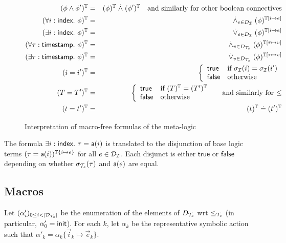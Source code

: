 \begin{figure}
  \begin{eqnarray*}
    (\phi\wedge\phi')^{\mathbb{T}} &=& (\phi)^{\mathbb{T}} \stackrel{.}{\wedge} (\phi')^{\mathbb{T}}
    \quad \text{and similarly for other boolean connectives} \\
    (\forall i:\textsf{index}.~ \phi)^{\mathbb{T}} &=&
    \stackrel{.}{\wedge}_{e\in D_{\mathcal{I}}} (\phi)^{\mathbb{T}[i\mapsto e]} \\
    (\exists i:\textsf{index}.~ \phi)^{\mathbb{T}} &=&
    \stackrel{.}{\vee}_{e\in D_{\mathcal{I}}} (\phi)^{\mathbb{T}[i\mapsto e]} \\
    (\forall \tau:\textsf{timestamp}.~ \phi)^{\mathbb{T}} &=&
    \stackrel{.}{\wedge}_{v\in D_{\mathcal{T}_s}} (\phi)^{\mathbb{T}[\tau\mapsto v]} \\
    (\exists \tau:\textsf{timestamp}.~ \phi)^{\mathbb{T}} &=&
    \stackrel{.}{\vee}_{v\in D_{\mathcal{T}_s}} (\phi)^{\mathbb{T}[\tau\mapsto v]} \\
    (i=i')^{\mathbb{T}} &=&
    \left\{\begin{array}{ll}
      \mathsf{true} & \text{if } \sigma_{\mathcal{I}}(i)=\sigma_{\mathcal{I}}(i') \\
      \mathsf{false} & \text{otherwise}
    \end{array}\right. \\
    (T = T')^{\mathbb{T}} &=&
    \left\{\begin{array}{ll}
      \mathsf{true} & \text{if } (T)^{\mathbb{T}} = (T')^{\mathbb{T}} \\
      \mathsf{false} & \text{otherwise}
    \end{array}\right.
    \quad\text{ and similarly for $\leq$} \\
    (t=t')^{\mathbb{T}} &=& (t)^{\mathbb{T}} \stackrel{.}{=} (t')^{\mathbb{T}}
  \end{eqnarray*}
  \caption{Interpretation of macro-free formulas of the meta-logic}
  \label{fig:interpf}
\end{figure}

\begin{example}
  The formula
  $\exists i:\textsf{index}.~ \tau = \textsf{a}(i)$
  is translated to the disjunction of base logic terms
  $(\tau = \textsf{a}(i))^{\mathbb{T}\{i\mapsto e\}}$ for all $e \in \mathcal{D}_{\mathcal{I}}$.
  Each disjunct is either $\mathsf{true}$ or $\mathsf{false}$ depending on
  whether $\sigma_{\mathcal{T}_s}(\tau)$ and $\textsf{a}(e)$ are equal.
\end{example}

\subsection{Macros}
Let $(\alpha'_i)_{0 \leq i < |\mathcal{D}_{\mathcal{T}_s}|}$ be the enumeration of the elements
of $D_{\mathcal{T}_s}$ wrt $\leq_{\mathcal{T}_s}$ (in particular, $\alpha'_0 = \mathsf{init}$).
For each $k$, let $\alpha_k$ be the representative symbolic action
such that $\alpha'_k = \alpha_k\{\vec{i}_k\mapsto\vec{e}_k\}$.

